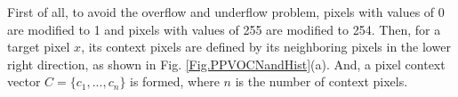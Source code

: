 \documentclass[review,3p,10pt,sort&compress]{elsarticle}
\begin{document}
First of all, to avoid the overflow and underflow problem, pixels with values of 0 are modified to 1 and pixels with values of 255 are modified to 254. Then, for a target pixel $x$, its context pixels are defined by its neighboring pixels in the lower right direction, as shown in Fig. \ref{Fig.PPVOCNandHist}(a). And, a pixel context vector $C=\{c_1,...,c_n\}$ is formed, where $n$ is the number of context pixels.
\begin{figure}
\centering
{}
\qquad\qquad
{}
\end{figure}
\end{document}
